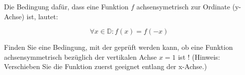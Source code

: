 \item Die Bedingung dafür, dass eine Funktion $f$ achsensymetrisch zur Ordinate (y-Achse) ist, lautet:

$$\forall x \in \mathbb{D}: f(x) = f(-x)$$

Finden Sie eine Bedingung, mit der geprüft werden kann, ob eine Funktion achsensymmetrisch bezüglich der vertikalen Achse $x=1$ ist ! (Hinweis: Verschieben Sie die Funktion zuerst geeignet entlang der x-Achse.)

